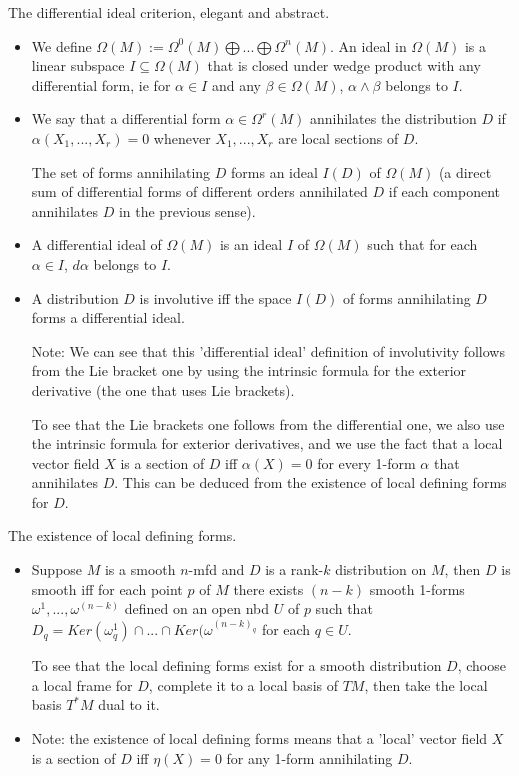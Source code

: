 \documentclass{report}
\theoremstyle{definition}
\begin{document}
The differential ideal criterion, elegant and abstract.
\begin{itemize}
    \item We define $\Omega(M):=\Omega^0(M)\bigoplus...\bigoplus\Omega^n(M)$. An ideal in $\Omega(M)$ is a linear subspace $I\subseteq\Omega(M)$ that is closed under wedge product with any differential form, ie for $\alpha\in I$ and any $\beta\in\Omega(M)$, $\alpha\wedge\beta$ belongs to $I$.
    \item We say that a differential form $\alpha\in\Omega^r(M)$ annihilates the distribution $D$ if $\alpha(X_1,...,X_r)=0$ whenever $X_1,...,X_r$ are local sections of $D$.

    The set of forms annihilating $D$ forms an ideal $I(D)$ of $\Omega(M)$ (a direct sum of differential forms of different orders annihilated $D$ if each component annihilates $D$ in the previous sense).
    \item A differential ideal of $\Omega(M)$ is an ideal $I$ of $\Omega(M)$ such that for each $\alpha\in I$, $d\alpha$ belongs to $I$.
    \item A distribution $D$ is involutive iff the space $I(D)$ of forms annihilating $D$ forms a differential ideal.

    Note: We can see that this 'differential ideal' definition of involutivity follows from the Lie bracket one by using the intrinsic formula for the exterior derivative (the one that uses Lie brackets).

    To see that the Lie brackets one follows from the differential one, we also use the intrinsic formula for exterior derivatives, and we use the fact that a local vector field $X$ is a section of $D$ iff $\alpha(X)=0$ for every 1-form $\alpha$ that annihilates $D$. This can be deduced from the existence of local defining forms for $D$.
\end{itemize}

The existence of local defining forms.
\begin{itemize}
    \item Suppose $M$ is a smooth $n$-mfd and $D$ is a rank-$k$ distribution on $M$, then $D$ is smooth iff for each point $p$ of $M$ there exists $(n-k)$ smooth 1-forms $\omega^1,...,\omega^{(n-k)}$ defined on an open nbd $U$ of $p$ such that $D_q=Ker(\omega^1_q)\cap...\cap Ker(\omega^{(n-k)_q}$ for each $q\in U$.

    To see that the local defining forms exist for a smooth distribution $D$, choose a local frame for $D$, complete it to a local basis of $TM$, then take the local basis $T^*M$ dual to it.
    \item Note: the existence of local defining forms means that a 'local' vector field $X$ is a section of $D$ iff $\eta(X)=0$ for any 1-form annihilating $D$.
\end{itemize}
\end{document}
